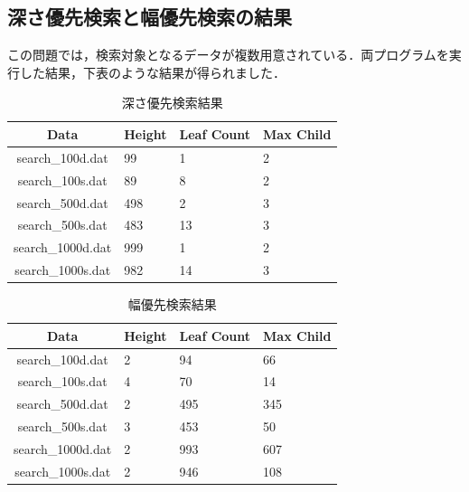 \documentclass[a4j, titlepage]{jarticle}
\begin{document}
    \subsection{深さ優先検索と幅優先検索の結果}
    この問題では，検索対象となるデータが複数用意されている．両プログラムを実行した結果，下表のような結果が得られました．
    \begin{longtable}[c]{|c|l|l|l|}
        \caption{深さ優先検索結果}
        \label{tab:dfsres}\\
        \hline
        \rowcolor[HTML]{C0C0C0} 
        \cellcolor[HTML]{C0C0C0}Data & \multicolumn{1}{c|}{\cellcolor[HTML]{C0C0C0}Height} & \multicolumn{1}{c|}{\cellcolor[HTML]{C0C0C0}Leaf Count} & \multicolumn{1}{c|}{\cellcolor[HTML]{C0C0C0}Max Child} \\ \hline
        \endfirsthead
        \endhead
        search\_100d.dat      & 99         & 1      & 2   \\ \hline
        search\_100s.dat      & 89         & 8      & 2   \\ \hline
        search\_500d.dat      & 498        & 2      & 3   \\ \hline
        search\_500s.dat      & 483        & 13     & 3   \\ \hline
        search\_1000d.dat     & 999        & 1      & 2   \\ \hline
        search\_1000s.dat     & 982        & 14     & 3   \\ \hline
    \end{longtable}
    \begin{longtable}[c]{|c|l|l|l|}
        \caption{幅優先検索結果}
        \label{tab:bfsres}\\
        \hline
        \rowcolor[HTML]{C0C0C0} 
        \cellcolor[HTML]{C0C0C0}Data & \multicolumn{1}{c|}{\cellcolor[HTML]{C0C0C0}Height} & \multicolumn{1}{c|}{\cellcolor[HTML]{C0C0C0}Leaf Count} & \multicolumn{1}{c|}{\cellcolor[HTML]{C0C0C0}Max Child} \\ \hline
        \endfirsthead
        \endhead
        search\_100d.dat      & 2          & 94      & 66   \\ \hline
        search\_100s.dat      & 4         & 70      & 14   \\ \hline
        search\_500d.dat      & 2        & 495      & 345   \\ \hline
        search\_500s.dat      & 3        & 453     & 50   \\ \hline
        search\_1000d.dat     & 2        & 993      & 607   \\ \hline
        search\_1000s.dat     & 2        & 946     & 108   \\ \hline
    \end{longtable}
\end{document}
